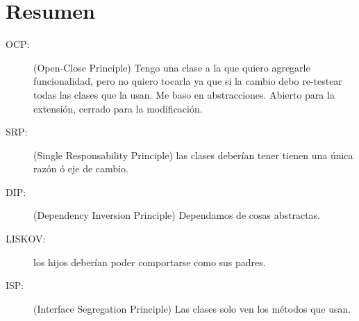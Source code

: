 \documentclass[10pt,a4paper]{article}
\begin{document}
\section{Resumen}

\begin{description}
\item[OCP:] (Open-Close Principle)
Tengo una clase a la que quiero agregarle funcionalidad, pero no quiero tocarla ya que
si la cambio debo re-testear todas las clases que la usan. Me baso en abstracciones.
Abierto para la extensión, cerrado para la modificación.

\item[SRP:] (Single Responsability Principle)
las clases deberían tener tienen una única razón ó eje de cambio.

\item[DIP:] (Dependency Inversion Principle)
Dependamos de cosas abstractas.

\item[LISKOV:] 
los hijos deberían poder comportarse como sus padres.

\item[ISP:] (Interface Segregation Principle)
Las clases solo ven los métodos que usan.

\end{description}
\end{document}

